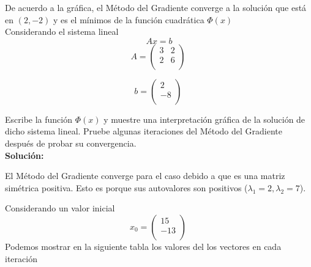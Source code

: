 De acuerdo a la gráfica, el Método del Gradiente converge a la solución que está en $(2,-2)$ y es el mínimos de la función cuadrática $\Phi(x)$\\


Considerando el sistema lineal
$$ Ax=b$$
$$ A=\begin{pmatrix}
     3 &  2 \\
     2 &  6 \\
    \end{pmatrix}\ $$
    
$$ b=\begin{pmatrix}
     2 \\
     -8 \\
    \end{pmatrix}\ $$
    
Escribe la función $ \Phi(x) $ y muestre una interpretación gráfica de la solución de dicho sistema lineal. Pruebe algunas iteraciones del Método del Gradiente después de probar su convergencia.\\

\textbf{Solución:}

El Método del Gradiente converge para el caso debido a que es una matriz simétrica positiva. Esto es porque sus autovalores son positivos ($ \lambda_1=2, \lambda_2=7$).

Considerando un valor inicial 
$$x_0 = \begin{pmatrix}
     15 \\
     -13 \\
    \end{pmatrix}\ $$
Podemos mostrar en la siguiente tabla los valores del los vectores en cada iteración

